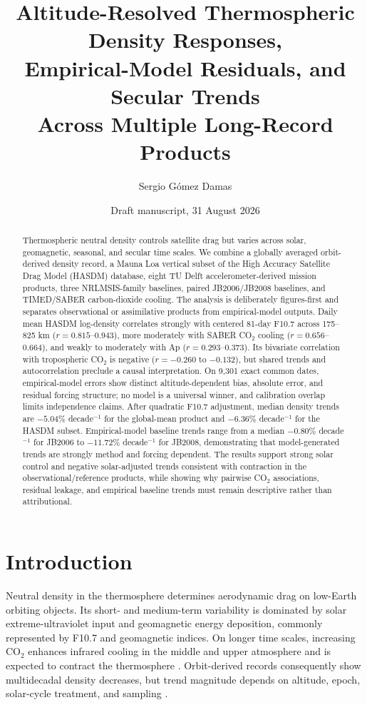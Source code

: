 \documentclass[11pt]{article}
\title{Altitude-Resolved Thermospheric Density Responses,\\
Empirical-Model Residuals, and Secular Trends\\
Across Multiple Long-Record Products}
\author{Sergio G\'omez Damas}
\date{Draft manuscript, 31 August 2026}
\begin{document}
\maketitle

\begin{abstract}
Thermospheric neutral density controls satellite drag but varies across solar,
geomagnetic, seasonal, and secular time scales.  We combine a globally averaged
orbit-derived density record, a Mauna Loa vertical subset of the High Accuracy
Satellite Drag Model (HASDM) database, eight TU Delft accelerometer-derived
mission products, three NRLMSIS-family baselines, paired JB2006/JB2008 baselines,
and TIMED/SABER carbon-dioxide cooling.  The analysis is deliberately
figures-first and separates observational or assimilative products from
empirical-model outputs.  Daily mean HASDM log-density correlates strongly with
centered 81-day F10.7 across 175--825 km ($r=0.815$--$0.943$), more moderately
with SABER CO$_2$ cooling ($r=0.656$--$0.664$), and weakly to moderately with Ap
($r=0.293$--$0.373$).  Its bivariate correlation with tropospheric CO$_2$ is
negative ($r=-0.260$ to $-0.132$), but shared trends and autocorrelation preclude
a causal interpretation.  On 9,301 exact common dates, empirical-model errors
show distinct altitude-dependent bias, absolute error, and residual forcing
structure; no model is a universal winner, and calibration overlap limits
independence claims.  After quadratic F10.7 adjustment, median density trends
are $-5.04\%$ decade$^{-1}$ for the global-mean product and
$-6.36\%$ decade$^{-1}$ for the HASDM subset.  Empirical-model baseline trends
range from a median $-0.80\%$ decade$^{-1}$ for JB2006 to
$-11.72\%$ decade$^{-1}$ for JB2008, demonstrating that model-generated trends
are strongly method and forcing dependent.  The results support strong solar
control and negative solar-adjusted trends consistent with contraction in the
observational/reference products,
while showing why pairwise CO$_2$ associations, residual leakage, and empirical
baseline trends must remain descriptive rather than attributional.
\end{abstract}

\section{Introduction}

Neutral density in the thermosphere determines aerodynamic drag on low-Earth
orbiting objects.  Its short- and medium-term variability is dominated by solar
extreme-ultraviolet input and geomagnetic energy deposition, commonly
represented by F10.7 and geomagnetic indices.  On longer time scales, increasing
CO$_2$ enhances infrared cooling in the middle and upper atmosphere and is
expected to contract the thermosphere \citep{roble1989,brown2024}.  Orbit-derived
records consequently show multidecadal density decreases, but trend magnitude
depends on altitude, epoch, solar-cycle treatment, and sampling
\citep{emmert2009,emmert2015,brown2024}.
\end{document}

